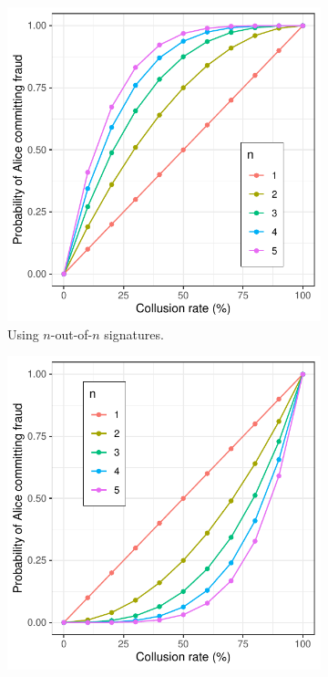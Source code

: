 \documentclass{article}
\begin{document}
\begin{figure}[t]
       \centering
       \begin{subfigure}[t]{.5\textwidth}
               \centering
               \captionsetup{width=.9\linewidth}
               \includegraphics[width=.9\linewidth]{assets/fraud_probability_n_out_of_n.pdf}
               \caption{Using $n$-out-of-$n$ signatures.}
               \label{fig:prob_fraud_n_out_of_n_signatures}
       \end{subfigure}%
       \begin{subfigure}[t]{.5\textwidth}
               \centering
               \captionsetup{width=.9\linewidth}
               \includegraphics[width=.9\linewidth]{assets/fraud_probability_1_out_of_n.pdf}

\end{subfigure}
\end{figure}
\end{document}
